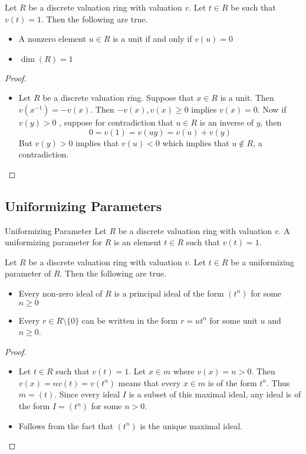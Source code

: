 \documentclass[a4paper]{article}
\begin{document}
\begin{prp}{}{} Let $R$ be a discrete valuation ring with valuation $v$. Let $t\in R$ be such that $v(t)=1$. Then the following are true. 
\begin{itemize}
\item A nonzero element $u\in R$ is a unit if and only if $v(u)=0$
\item $\dim(R)=1$
\end{itemize}\tcbline
\begin{proof}~\\
\begin{itemize}
\item Let $R$ be a discrete valuation ring. Suppose that $x\in R$ is a unit. Then $v(x^{-1})=-v(x)$. Then $-v(x),v(x)\geq 0$ implies $v(x)=0$. Now if $v(y)>0$ , suppose for contradiction that $u\in R$ is an inverse of $y$, then $$0=v(1)=v(uy)=v(u)+v(y)$$ But $v(y)>0$ implies that $v(u)<0$ which implies that $u\notin R$, a contradiction. 
\end{itemize}
\end{proof}
\end{prp}

\subsection{Uniformizing Parameters}
\begin{defn}{Uniformizing Parameter}{} Let $R$ be a discrete valuation ring with valuation $v$. A uniformizing parameter for $R$ is an element $t\in R$ such that $v(t)=1$. 
\end{defn}

\begin{prp}{}{} Let $R$ be a discrete valuation ring with valuation $v$. Let $t\in R$ be a uniformizing parameter of $R$. Then the following are true. 
\begin{itemize}
\item Every non-zero ideal of $R$ is a principal ideal of the form $(t^n)$ for some $n\geq 0$
\item Every $r\in R\setminus\{0\}$ can be written in the form $r=ut^n$ for some unit $u$ and $n\geq 0$. 
\end{itemize}\tcbline
\begin{proof}~\\
\begin{itemize}
\item Let $t\in R$ such that $v(t)=1$. Let $x\in m$ where $v(x)=n>0$. Then $v(x)=nv(t)=v(t^n)$ means that every $x\in m$ is of the form $t^n$. Thus $m=(t)$. Since every ideal $I$ is a subset of this maximal ideal, any ideal is of the form $I=(t^n)$ for some $n>0$. 
\item Follows from the fact that $(t^n)$ is the unique maximal ideal. 
\end{itemize}
\end{proof}
\end{prp}
\end{document}
